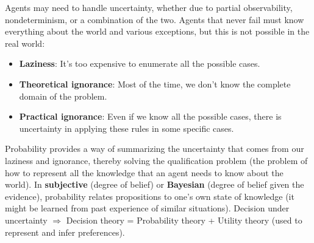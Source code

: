 \documentclass[12pt]{article}
\begin{document}
Agents may need to handle uncertainty, whether due to partial observability, nondeterminism, or a combination of the two. Agents that never fail must know everything about the world and various exceptions, but this is not possible in the real world:

\begin{itemize}
    \item \textbf{Laziness}: It's too expensive to enumerate all the possible cases.
    \item \textbf{Theoretical ignorance}: Most of the time, we don't know the complete domain of the problem.
    \item \textbf{Practical ignorance}: Even if we know all the possible cases, there is uncertainty in applying these rules in some specific cases.
\end{itemize}

Probability provides a way of summarizing the uncertainty that comes from our laziness and ignorance, thereby solving the qualification problem (the problem of how to represent all the knowledge that an agent needs to know about the world). In \textbf{subjective} (degree of belief) or \textbf{Bayesian} (degree of belief given the evidence), probability relates propositions to one's own state of knowledge (it might be learned from past experience of similar situations). Decision under uncertainty $\Rightarrow$ Decision theory = Probability theory + Utility theory (used to represent and infer preferences).
\end{document}
